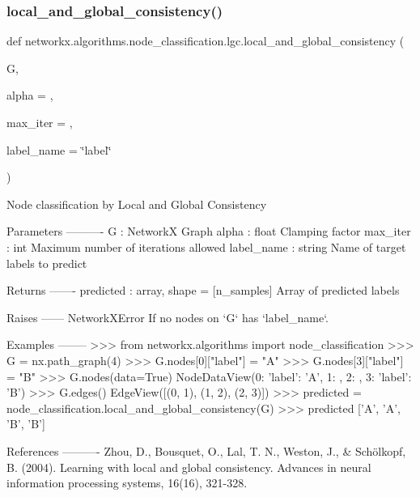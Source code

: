 \subsubsection{\texorpdfstring{local\+\_\+and\+\_\+global\+\_\+consistency()}{local\_and\_global\_consistency()}}
{\footnotesize\ttfamily def networkx.\+algorithms.\+node\+\_\+classification.\+lgc.\+local\+\_\+and\+\_\+global\+\_\+consistency (\begin{DoxyParamCaption}\item[{}]{G,  }\item[{}]{alpha = {},  }\item[{}]{max\+\_\+iter = {},  }\item[{}]{label\+\_\+name = {\ttfamily \char`\"{}label\char`\"{}} }\end{DoxyParamCaption})}

\begin{DoxyVerb}Node classification by Local and Global Consistency

Parameters
----------
G : NetworkX Graph
alpha : float
    Clamping factor
max_iter : int
    Maximum number of iterations allowed
label_name : string
    Name of target labels to predict

Returns
-------
predicted : array, shape = [n_samples]
    Array of predicted labels

Raises
------
NetworkXError
    If no nodes on `G` has `label_name`.

Examples
--------
>>> from networkx.algorithms import node_classification
>>> G = nx.path_graph(4)
>>> G.nodes[0]["label"] = "A"
>>> G.nodes[3]["label"] = "B"
>>> G.nodes(data=True)
NodeDataView({0: {'label': 'A'}, 1: {}, 2: {}, 3: {'label': 'B'}})
>>> G.edges()
EdgeView([(0, 1), (1, 2), (2, 3)])
>>> predicted = node_classification.local_and_global_consistency(G)
>>> predicted
['A', 'A', 'B', 'B']


References
----------
Zhou, D., Bousquet, O., Lal, T. N., Weston, J., & Schölkopf, B. (2004).
Learning with local and global consistency.
Advances in neural information processing systems, 16(16), 321-328.
\end{DoxyVerb}
 